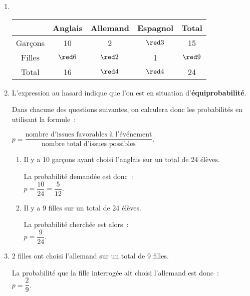 \begin{corrige}
     \begin{enumerate}
          \item %
          ~\\
          \begin{center}
               \begin{tabular}{|c|c|c|c|c|} %
                    \hline
                    & Anglais & Allemand & Espagnol & Total \\
                    \hline
                    Garçons & 10 & 2 & $\red 3$   & 15 \\
                    \hline
                    Filles & $\red 6$   & $\red 2$   & 1 &  $\red 9$  \\
                    \hline
                    Total & 16  &  $\red 4$  & $\red 4$  &  24 \\
                    \hline
               \end{tabular}
          \end{center}
          \item %
          L'expression \og au hasard \fg{} indique que l'on est en situation d'\textbf{équiprobabilité}.
          \par
          Dans chacune des questions suivantes, on calculera donc les probabilités en utilisant la formule~:
          \begin{center}
               $p=\dfrac{\text{nombre d}'\text{issues favorables à l}'\text{événement}}{\text{nombre total d'issues possibles}}.$
          \end{center}
          \begin{enumerate}[label=\alph*.]
               \item %
               Il y a 10 garçons ayant choisi l'anglais sur un total de 24 élèves.
               \par
               La probabilité demandée est donc~:\\
               $p=\dfrac{10}{24}=\dfrac{5}{12}.$
               \item %
               Il y a 9 filles  sur un total de 24 élèves.
               \par
               La probabilité cherchée est alors~:\\
               $p=\dfrac{9}{24}.$
          \end{enumerate}
          \item %
          2 filles ont choisi l'allemand sur un total de 9 filles.
          \par
          La probabilité que la fille interrogée ait choisi l'allemand est donc~:\\
          $p=\dfrac{2}{9}.$
     \end{enumerate}
\end{corrige}
